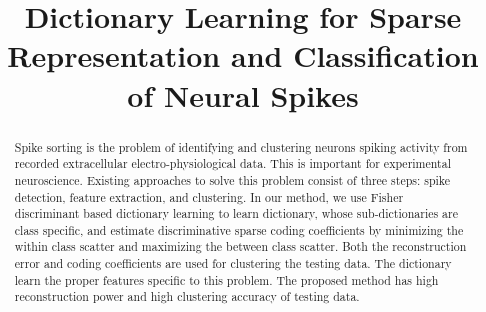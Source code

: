 \documentclass[conference]{IEEEtran}
\begin{document}
\title{Dictionary Learning for Sparse Representation and Classification of Neural Spikes}
\author{
}

\newcommand{\paralleled}[1]{\Vert{#1}\Vert}
\newcommand{\bigparalleled}[1]{\big\Vert{#1}\big\Vert}
\newcommand{\Bigparalleled}[1]{\Big\Vert{#1}\Big\Vert}
\newcommand{\biggparalleled}[1]{\bigg\Vert{#1}\bigg\Vert}
\newcommand{\Biggparalleled}[1]{\Bigg\Vert{#1}\Bigg\Vert}

\renewcommand*{\theszaml}{\arabic{szaml}}

\maketitle
	
	\begin{abstract}
		Spike sorting is the problem of identifying and
		clustering neurons spiking activity from recorded extracellular
		electro-physiological data. This is important for experimental
		neuroscience. Existing approaches to solve this problem consist of
		three steps: spike detection, feature extraction, and clustering. In
		our method, we use Fisher discriminant based dictionary learning
		to learn dictionary, whose sub-dictionaries are class specific, and
		estimate discriminative sparse coding coefficients by minimizing
		the within class scatter and maximizing the between class scatter.
		Both the reconstruction error and coding coefficients are used
		for clustering the testing data. The dictionary learn the proper
		features specific to this problem. The proposed method has high
		reconstruction power and high clustering accuracy of testing
		data.
	\end{abstract}
	
\end{document}
